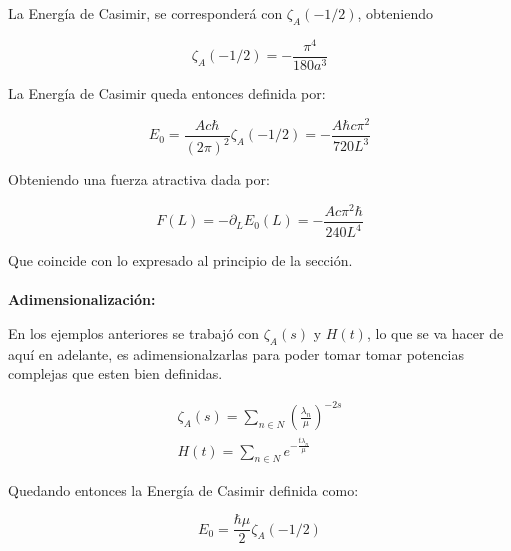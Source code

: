 La Energía de Casimir, se corresponderá con $\zeta _A (-1/2)$, obteniendo 


\begin{equation}
\zeta _A (-1/2) = 
- \frac{\pi ^4}{180 a ^3}
\end{equation}

La Energía de Casimir queda entonces definida por:

\begin{equation}
E _0 =  \frac{A c \hbar}{(2 \pi) ^2}
\zeta _A (-1/2) =
- \frac{A \hbar c \pi ^2}
		{720 L ^3}
\end{equation}

Obteniendo una fuerza atractiva dada por:

\begin{equation}
F(L) = - \partial _L E _0 (L) = 
- \frac{A c \pi ^2 \hbar}{240 L^4}
\end{equation}

Que coincide con lo expresado al principio de la sección. \\ \\



\textbf{Adimensionalización:\\}


En los ejemplos anteriores se trabajó con  $\zeta _A (s) $ y $H(t)$, lo que se va hacer de aquí en adelante, es adimensionalzarlas para poder tomar tomar potencias complejas que esten bien definidas.


\begin{equation}
\begin{array}{c}


\zeta _A (s) = \sum _{n \in N} \left( \frac{\lambda _n}{\mu }  \right) ^{-2s } \\[10pt]

H (t)  = \sum \limits_{n \in N} e ^{- \frac{t \lambda _{n}}{\mu} }

\end{array}
\end{equation}

Quedando entonces la Energía de Casimir definida como:

\begin{equation}
E _0 = \frac{\hbar \mu}{2} \zeta _A (-1/2)
\end{equation}